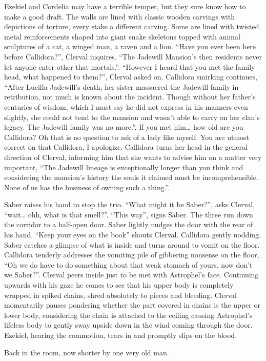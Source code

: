 Ezekiel and Cordelia may have a terrible temper, but they sure know how
to make a good draft. The walls are lined with classic wooden carvings
with depictions of torture, every stake a different carving. Some are
lined with twisted metal reinforcements shaped into giant snake
skeletons topped with animal sculptures of a cat, a winged man, a raven
and a lion. ``Have you ever been here before Callidora?'', Clerval
inquires. ``The Jadewill Mansion's then residents never let anyone enter
other that mortals.''. ``However I heard that you met the family head,
what happened to them?'', Clerval asked on. Callidora smirking
continues, ``After Lucilla Jadewill's death, her sister massacred the
Jadewill family in retribution, not much is known about the incident.
Though without her father's centuries of wisdom, which I must say he did
not express in his manners even slightly, she could not tend to the
mansion and wasn't able to carry on her clan's legacy. The Jadewill
family was no more.''. If you met him\ldots{} how old are you Callidora?
Oh that is no question to ask of a lady like myself. You are utmost
correct on that Callidora, I apologize. Callidora turns her head in the
general direction of Clerval, informing him that she wants to advise him
on a matter very important, ``The Jadewill lineage is exceptionally
longer than you think and considering the mansion's history the souls it
claimed must be incomprehensible. None of us has the business of owning
such a thing.''.

Saber raises his hand to stop the trio. ``What might it be Saber?'',
asks Clerval, ``wait\ldots{} ohh, what is that smell?''. ``This way'',
signs Saber. The three run down the corridor to a half-open door. Saber
lightly nudges the door with the rear of his hand. ``Keep your eyes on
the book'' shouts Clerval. Callidora gently nodding. Saber catches a
glimpse of what is inside and turns around to vomit on the floor.
Callidora tenderly addresses the vomiting pile of gibbering nonsense on
the floor, ``Oh we do have to do something about that weak stomach of
yours, now don't we Saber?''. Clerval peers inside just to be met with
Astrophel's face. Continuing upwards with his gaze he comes to see that
his upper body is completely wrapped in spiked chains, shred absolutely
to pieces and bleeding. Clerval momentarily pauses pondering whether the
part covered in chains is the upper or lower body, considering the chain
is attached to the ceiling causing Astrophel's lifeless body to gently
sway upside down in the wind coming through the door. Ezekiel, hearing
the commotion, tears in and promptly slips on the blood.

Back in the room, now shorter by one very old man.
